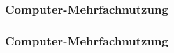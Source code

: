 \begin{frame}
\frametitle{Computer-Mehrfachnutzung}
\begin{itemize}
  
\end{itemize}
\end{frame}

\begin{frame}
\frametitle{Computer-Mehrfachnutzung}
\begin{itemize}
  
\end{itemize}
\end{frame}